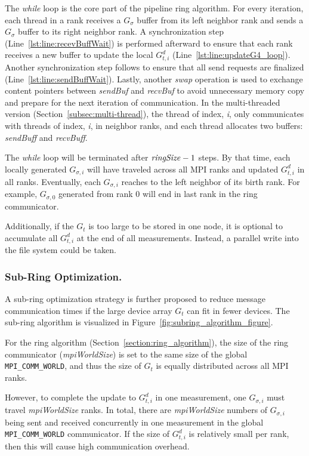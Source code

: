 The \textit{while} loop is the core part of the pipeline ring algorithm. 
%
For every iteration, each thread in a rank 
receives a $G_{\sigma}$ buffer from its left neighbor rank and sends a $G_{\sigma}$ buffer to its right neighbor rank. 
A synchronization step (Line~\ref{lst:line:recevBuffWait}) is performed
afterward to ensure that each rank receives a new buffer to update the 
local $G^d_{t,i}$ (Line~\ref{lst:line:updateG4_loop}). 
%
Another synchronization step
follows to ensure that all send requests are finalized 
(Line~\ref{lst:line:sendBuffWait}). Lastly, another \textit{swap} operation is used to exchange
content pointers between \textit{sendBuf} and \textit{recvBuf} to avoid unnecessary memory copy and prepare
for the next iteration of communication.
%
In the multi-threaded version (Section~\ref{subsec:multi-thread}), the thread of index, \textit{i}, only communicates with
	threads of index, \textit{i}, in neighbor ranks, and each thread allocates two buffers: \textit{sendBuff} and \textit{recvBuff}.

The \textit{while} loop will be terminated after $\mbox{\textit{ringSize}} - 1$ steps. By that time, 
each locally generated $G_{\sigma,i}$ will have traveled across all MPI ranks and
updated $G^d_{t,i}$ in all ranks. Eventually, each $G_{\sigma,i}$ reaches
to the left neighbor of its birth rank. For example, $G_{\sigma,0}$ generated from rank $0$ will end 
in last rank in the ring communicator.

Additionally, if the $G_t$ is too large to be stored in one node, 
it is optional to accumulate all $G^d_{t,i}$
at the end of all measurements. 
%
Instead, a parallel write into the file system could be taken.

\subsubsection{Sub-Ring Optimization.}

A sub-ring optimization strategy is further proposed to reduce message communication
times if the large device array $G_t$ can fit in fewer devices. 
%
The sub-ring algorithm is visualized in Figure~\ref{fig:subring_algorithm_figure}.

For the ring algorithm (Section~\ref{section:ring_algorithm}), the size of the ring communicator
(\textit{mpiWorldSize}) is set to the same size of the global \mbox{\texttt{MPI\_COMM\_WORLD}}, and thus the size of $G_t$ is equally 
distributed across all MPI ranks.

However, to complete the update to $G^d_{t,i}$ in one measurement, 
one $G_{\sigma,i}$
must travel \textit{mpiWorldSize} ranks. In total, 
there are \textit{mpiWorldSize} numbers of $G_{\sigma,i}$
being sent and received concurrently in one measurement 
in the global
\mbox{\texttt{MPI\_COMM\_WORLD}} 
communicator. If the size of $G^d_{t,i}$ is relatively small per rank, then this will cause high communication overhead.

